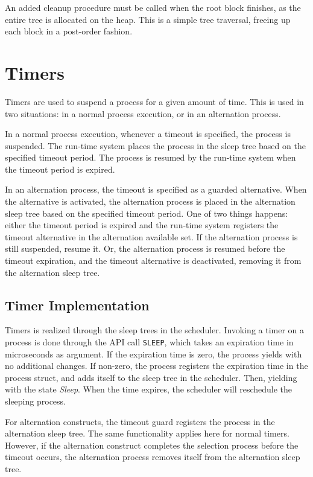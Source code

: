 An added cleanup procedure must be called when the root block finishes, as the entire tree is allocated on the heap. This is a simple tree traversal, freeing up each block in a post\hyp{}order fashion. 


\section{Timers}
\label{sec:timers}

Timers are used to suspend a process for a given amount of time. This is used in two situations: in a normal process execution, or in an alternation process. 

In a normal process execution, whenever a timeout is specified, the process is suspended. The run\hyp{}time system places the process in the sleep tree based on the specified timeout period. The process is resumed by the run\hyp{}time system when the timeout period is expired.

In an alternation process, the timeout is specified as a guarded alternative. When the alternative is activated, the alternation process is placed in the alternation sleep tree based on the specified timeout period. One of two things happens: either the timeout period is expired and the run\hyp{}time system registers the timeout alternative in the alternation available set. If the alternation process is still suspended, resume it. Or, the alternation process is resumed before the timeout expiration, and the timeout alternative is deactivated, removing it from the alternation sleep tree. 


\subsection{Timer Implementation}

Timers is realized through the sleep trees in the scheduler. Invoking a timer on a process is done through the API call \texttt{SLEEP}, which takes an expiration time in microseconds as argument. If the expiration time is zero, the process yields with no additional changes. If non\hyp{}zero, the process registers the expiration time in the process struct, and adds itself to the sleep tree in the scheduler. Then, yielding with the state \textit{Sleep}. When the time expires, the scheduler will reschedule the sleeping process.

For alternation constructs, the timeout guard registers the process in the alternation sleep tree. The same functionality applies here for normal timers. However, if the alternation construct completes the selection process before the timeout occurs, the alternation process removes itself from the alternation sleep tree. 


